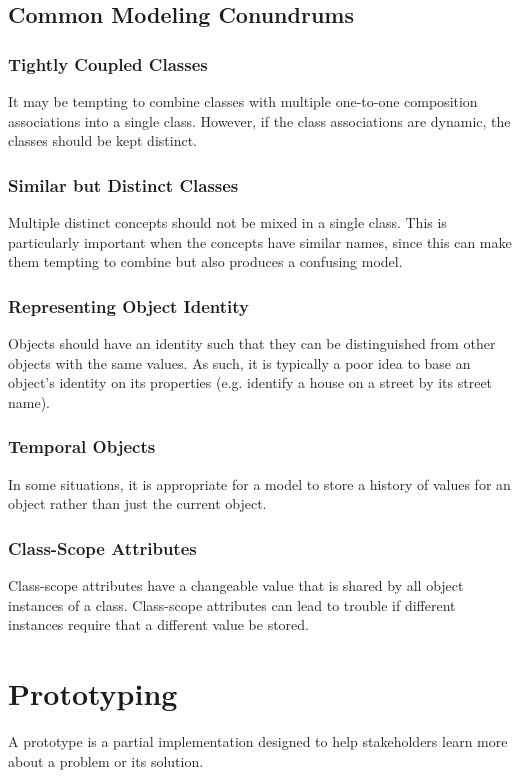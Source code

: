 \documentclass[12pt,titlepage]{article}
\begin{document}
    \subsection{Common Modeling Conundrums}

      \subsubsection{Tightly Coupled Classes}
        It may be tempting to combine classes with multiple one-to-one composition associations into a single class. However, if the class associations are dynamic, the classes should
        be kept distinct.

      \subsubsection{Similar but Distinct Classes}
        Multiple distinct concepts should not be mixed in a single class. This is particularly important when the concepts have similar names, since this can make them tempting to
        combine but also produces a confusing model.

      \subsubsection{Representing Object Identity}
        Objects should have an identity such that they can be distinguished from other objects with the same values. As such, it is typically a poor idea to base an object's identity
        on its properties (e.g. identify a house on a street by its street name).

      \subsubsection{Temporal Objects}
        In some situations, it is appropriate for a model to store a history of values for an object rather than just the current object.

      \subsubsection{Class-Scope Attributes}
        Class-scope attributes have a changeable value that is shared by all object instances of a class. Class-scope attributes can lead to trouble if different instances require
        that a different value be stored.

  \section{Prototyping}
    A prototype is a partial implementation designed to help stakeholders learn more about a problem or its solution.
\end{document}
